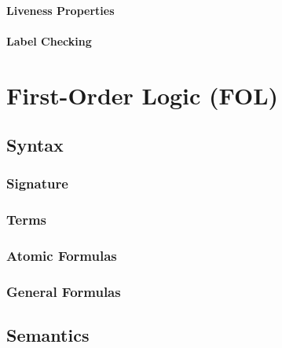 \documentclass[a4paper, 11pt, accentcolor = tud3b]{tudreport}
\begin{document}
                \subsubsection{Liveness Properties} %

                \subsubsection{Label Checking} %

    \chapter{First-Order Logic (FOL)} %

        \section{Syntax} %

            \subsection{Signature} %

            \subsection{Terms} %

            \subsection{Atomic Formulas} %

            \subsection{General Formulas} %

        \section{Semantics} %
\end{document}
